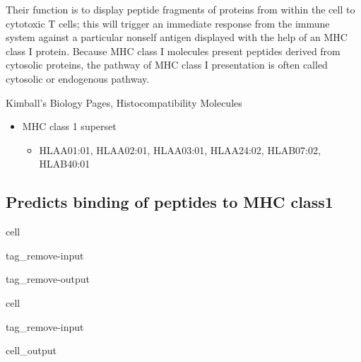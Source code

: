 \documentclass[letterpaper,10pt,english]{jupyterBook}
\begin{document}
\sphinxAtStartPar
Their function is to display peptide fragments of proteins from within the cell to cytotoxic T cells; this will trigger an immediate response from the immune system against a particular non\sphinxhyphen{}self antigen displayed with the help of an MHC class I protein. Because MHC class I molecules present peptides derived from cytosolic proteins, the pathway of MHC class I presentation is often called cytosolic or endogenous pathway.%
\begin{footnote}[1]\sphinxAtStartFootnote
Kimball’s Biology Pages, Histocompatibility Molecules
%
\end{footnote}
\begin{itemize}
\item {} 
\sphinxAtStartPar
MHC class 1 superset
\begin{itemize}
\item {} 
\sphinxAtStartPar
HLA\sphinxhyphen{}A01:01, HLA\sphinxhyphen{}A02:01, HLA\sphinxhyphen{}A03:01, HLA\sphinxhyphen{}A24:02, HLA\sphinxhyphen{}B07:02, HLA\sphinxhyphen{}B40:01

\end{itemize}

\end{itemize}


\subsection{Predicts binding of peptides to MHC class1}
\label{\detokenize{ipynb/chapter2:predicts-binding-of-peptides-to-mhc-class1}}
\begin{sphinxuseclass}{cell}
\begin{sphinxuseclass}{tag_remove-input}
\begin{sphinxuseclass}{tag_remove-output}
\end{sphinxuseclass}
\end{sphinxuseclass}
\end{sphinxuseclass}
\begin{sphinxuseclass}{cell}
\begin{sphinxuseclass}{tag_remove-input}\begin{sphinxVerbatimOutput}

\begin{sphinxuseclass}{cell_output}
\noindent{}

\end{sphinxuseclass}\end{sphinxVerbatimOutput}

\end{sphinxuseclass}
\end{sphinxuseclass}
\end{document}
